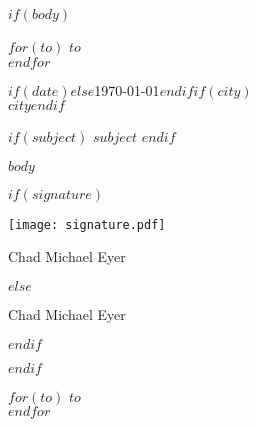 \documentclass[$fontsize$, letter]{article}
\begin{document}
$if(body)$

\small

\vspace{1em}

\normalsize \sffamily
$for(to)$
$to$\\
$endfor$

\vspace{3em}

\rmfamily
\begin{flushright}
  $if(date)$$else$\today$endif$$if(city)$\\$city$$endif$
\end{flushright}

\vspace{1em}

$if(subject)$
\textbf{$subject$}
$endif$

\vspace{1em}

$body$

$if(signature)$
{
    \begin{FlushRight}  	\parbox[t]{0.6in}{\texttt{[image: signature.pdf]}}
    \vspace*{-3\baselineskip}Chad Michael Eyer
    \end{FlushRight}
}
$else$
    \begin{FlushRight}
    \vspace*{2.875\baselineskip}Chad Michael Eyer
    \end{FlushRight}
$endif$

\clearpage

$endif$


$for(to)$
\large\textocr\uppercase{$to$}\\
$endfor$
\end{document}
